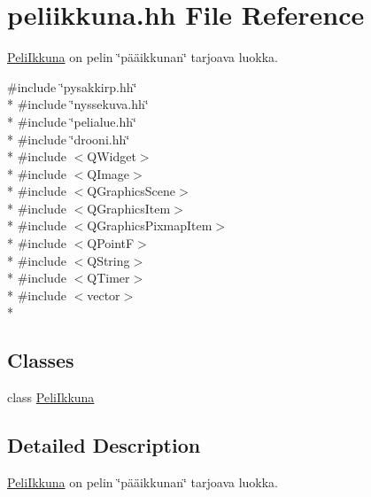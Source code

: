 \hypertarget{peliikkuna_8hh}{\section{peliikkuna.\-hh File Reference}
\label{peliikkuna_8hh}
}


\hyperlink{class_peli_ikkuna}{Peli\-Ikkuna} on pelin \char`\"{}pääikkunan\char`\"{} tarjoava luokka.  


{\ttfamily \#include \char`\"{}pysakkirp.\-hh\char`\"{}}\\*
{\ttfamily \#include \char`\"{}nyssekuva.\-hh\char`\"{}}\\*
{\ttfamily \#include \char`\"{}pelialue.\-hh\char`\"{}}\\*
{\ttfamily \#include \char`\"{}drooni.\-hh\char`\"{}}\\*
{\ttfamily \#include $<$Q\-Widget$>$}\\*
{\ttfamily \#include $<$Q\-Image$>$}\\*
{\ttfamily \#include $<$Q\-Graphics\-Scene$>$}\\*
{\ttfamily \#include $<$Q\-Graphics\-Item$>$}\\*
{\ttfamily \#include $<$Q\-Graphics\-Pixmap\-Item$>$}\\*
{\ttfamily \#include $<$Q\-Point\-F$>$}\\*
{\ttfamily \#include $<$Q\-String$>$}\\*
{\ttfamily \#include $<$Q\-Timer$>$}\\*
{\ttfamily \#include $<$vector$>$}\\*
\subsection*{Classes}
\begin{DoxyCompactItemize}
\item 
class \hyperlink{class_peli_ikkuna}{Peli\-Ikkuna}
\end{DoxyCompactItemize}


\subsection{Detailed Description}
\hyperlink{class_peli_ikkuna}{Peli\-Ikkuna} on pelin \char`\"{}pääikkunan\char`\"{} tarjoava luokka. 